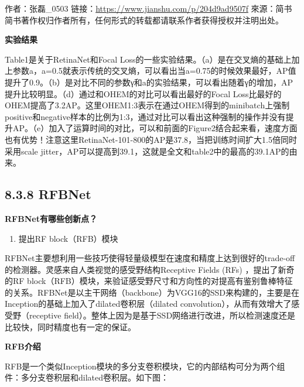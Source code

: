 作者：张磊\_0503 链接：\url{https://www.jianshu.com/p/204d9ad9507f}
來源：简书
简书著作权归作者所有，任何形式的转载都请联系作者获得授权并注明出处。

\textbf{实验结果}

Table1是关于RetinaNet和Focal
Loss的一些实验结果。（a）是在交叉熵的基础上加上参数a，a=0.5就表示传统的交叉熵，可以看出当a=0.75的时候效果最好，AP值提升了0.9。（b）是对比不同的参数γ和a的实验结果，可以看出随着γ的增加，AP提升比较明显。（d）通过和OHEM的对比可以看出最好的Focal
Loss比最好的OHEM提高了3.2AP。这里OHEM1:3表示在通过OHEM得到的minibatch上强制positive和negative样本的比例为1:3，通过对比可以看出这种强制的操作并没有提升AP。（e）加入了运算时间的对比，可以和前面的Figure2结合起来看，速度方面也有优势！注意这里RetinaNet-101-800的AP是37.8，当把训练时间扩大1.5倍同时采用scale
jitter，AP可以提高到39.1，这就是全文和table2中的最高的39.1AP的由来。

\begin{figure}
\centering
\caption{}
\end{figure}

\begin{figure}
\centering
\caption{}
\end{figure}

\subsection{8.3.8 RFBNet}\label{rfbnet}

\textbf{RFBNet有哪些创新点？}

\begin{enumerate}
\def\labelenumi{\arabic{enumi}.}
\item
  提出RF block（RFB）模块
\end{enumerate}

RFBNet主要想利用一些技巧使得轻量级模型在速度和精度上达到很好的trade-off的检测器。灵感来自人类视觉的感受野结构Receptive
Fields (RFs) ，提出了新奇的RF
block（RFB）模块，来验证感受野尺寸和方向性的对提高有鉴别鲁棒特征的关系。RFBNet是以主干网络（backbone）为VGG16的SSD来构建的，主要是在Inception的基础上加入了dilated卷积层（dilated
convolution），从而有效增大了感受野（receptive
field）。整体上因为是基于SSD网络进行改进，所以检测速度还是比较快，同时精度也有一定的保证。

\textbf{RFB介绍}

RFB是一个类似Inception模块的多分支卷积模块，它的内部结构可分为两个组件：多分支卷积层和dilated卷积层。如下图：

